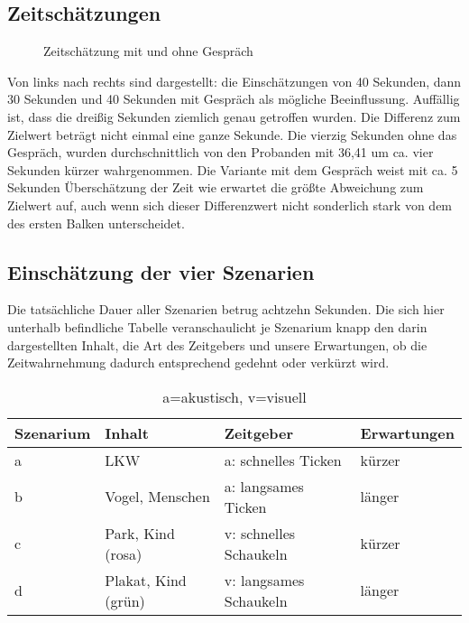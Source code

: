 \documentclass{Paper}
\begin{document}
\subsection{Zeitschätzungen}
\begin{figure}[H]
\caption{Zeitschätzung mit und ohne Gespräch}
\label{ZeitGespr}
\end{figure}
\par
Von links nach rechts sind dargestellt: die Einschätzungen von 40 Sekunden, dann 30 Sekunden und 40 Sekunden mit Gespräch als mögliche Beeinflussung. Auffällig ist, dass die dreißig Sekunden ziemlich genau getroffen wurden. Die Differenz zum Zielwert beträgt nicht einmal eine ganze Sekunde. Die vierzig Sekunden ohne das Gespräch, wurden durchschnittlich von den Probanden mit 36,41 um ca. vier Sekunden kürzer wahrgenommen. Die Variante mit dem Gespräch weist mit ca. 5 Sekunden Überschätzung der Zeit wie erwartet die größte Abweichung zum Zielwert auf, auch wenn sich dieser Differenzwert nicht sonderlich stark von dem des ersten Balken unterscheidet.

\subsection{Einschätzung der vier Szenarien}
\newpage
Die tatsächliche Dauer aller Szenarien betrug achtzehn Sekunden. Die sich hier unterhalb befindliche Tabelle veranschaulicht je Szenarium knapp den darin dargestellten Inhalt, die Art des Zeitgebers und unsere Erwartungen, ob die Zeitwahrnehmung dadurch entsprechend gedehnt oder verkürzt wird.
\begin{table}[H]
\centering
\begin{tabular}{llll}
	\hline
	\textbf{Szenarium} & \textbf{Inhalt} & \textbf{Zeitgeber}& \textbf{Erwartungen} \\
	\hline
	a & LKW & a: schnelles Ticken & kürzer \\
	b & Vogel, Menschen & a: langsames Ticken & länger\\
	c & Park, Kind (rosa) & v: schnelles Schaukeln & kürzer\\
	d & Plakat, Kind (grün) & v: langsames Schaukeln & länger \\
	\hline
\end{tabular}
\caption{a=akustisch, v=visuell}
\label{AkVis}
\end{table}
\end{document}

